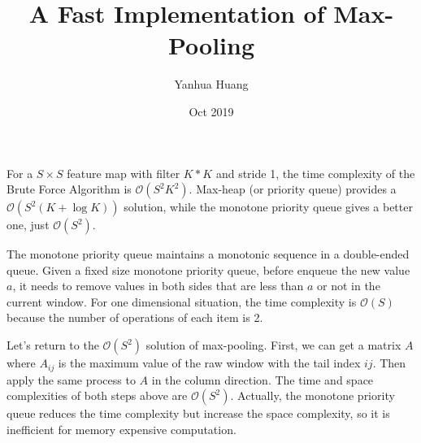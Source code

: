 \documentclass[a4paper,11pt]{article}
\begin{document}
\title{A Fast Implementation of Max-Pooling}
\author{Yanhua Huang}
\date{Oct 2019}
\maketitle

For a $S \times S$ feature map with filter $K * K$ and stride 1, the time complexity of the Brute Force Algorithm is $\mathcal{O}(S^2K^2)$. Max-heap (or priority queue) provides a $\mathcal{O}(S^2(K + \log K))$ solution, while the monotone priority queue gives a better one, just $\mathcal{O}(S^2)$.

The monotone priority queue maintains a monotonic sequence in a double-ended queue. Given a fixed size monotone priority queue, before enqueue the new value $a$, it needs to remove values in both sides that are less than $a$ or not in the current window. For one dimensional situation, the time complexity is $\mathcal{O}(S)$ because the number of operations of each item is 2.

Let's return to the $\mathcal{O}(S^2)$ solution of max-pooling. First, we can get a matrix $A$ where $A_{ij}$ is the maximum value of the raw window with the tail index $ij$. Then apply the same process to $A$ in the column direction. The time and space complexities of both steps above are $\mathcal{O}(S^2)$. Actually, the monotone priority queue reduces the time complexity but increase the space complexity, so it is inefficient for memory expensive computation.
\end{document}
